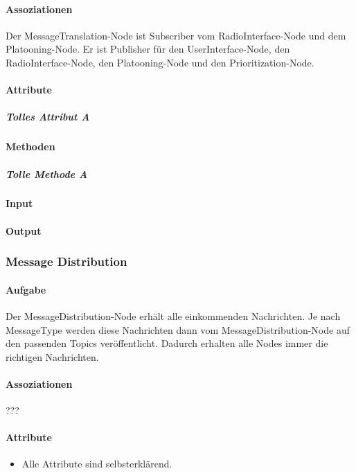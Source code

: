 \documentclass[a4paper, 12pt, titlepage]{scrartcl}
\begin{document}
				\paragraph{Assoziationen} Der MessageTranslation-Node ist Subscriber vom RadioInterface-Node und dem Platooning-Node. Er ist Publisher für den UserInterface-Node, den RadioInterface-Node, den Platooning-Node und den Prioritization-Node. 
				\paragraph{Attribute}
					\subparagraph{Tolles Attribut A}
				\paragraph{Methoden}
					\subparagraph{Tolle Methode A}
				\paragraph{Input}
				\paragraph{Output}

			\subsubsection{Message Distribution}
			\label{message_distribution}
				\paragraph{Aufgabe} Der MessageDistribution-Node erhält alle einkommenden Nachrichten. Je nach MessageType werden diese Nachrichten dann vom MessageDistribution-Node auf den passenden Topics veröffentlicht. Dadurch erhalten alle Nodes immer die richtigen Nachrichten. 
				\paragraph{Assoziationen} ???
				\paragraph{Attribute}
				    \begin{itemize}
				        \item Alle Attribute sind selbsterklärend. 
				    \end{itemize}
\end{document}
